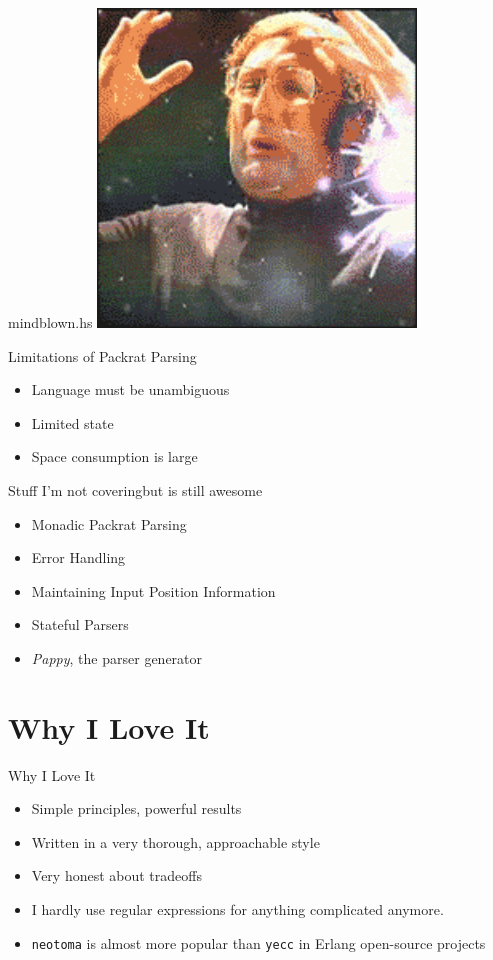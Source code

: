 \documentclass{beamer}
\begin{document}
\begin{frame}{mindblown.hs}
\center
\includegraphics[width=.8\textwidth]{mindblown.jpeg}
\end{frame}

\begin{frame}{Limitations of Packrat Parsing}
  \begin{itemize}
  \item Language must be unambiguous
  \item Limited state
  \item Space consumption is large
  \end{itemize}
\end{frame}

\begin{frame}{Stuff I'm not covering}{but is still awesome}
  \begin{itemize}
  \item Monadic Packrat Parsing
  \item Error Handling
  \item Maintaining Input Position Information
  \item Stateful Parsers
  \item \textit{Pappy}, the parser generator
  \end{itemize}
\end{frame}

\section{Why I Love It}
\begin{frame}{Why I Love It}
  \begin{itemize}
  \item Simple principles, powerful results
  \item Written in a very thorough, approachable style
  \item Very honest about tradeoffs
    \pause
  \item I hardly use regular expressions for anything complicated
    anymore.
  \item \texttt{neotoma} is almost more popular than \texttt{yecc} in
    Erlang open-source projects
  \end{itemize}
\end{frame}
\end{document}
